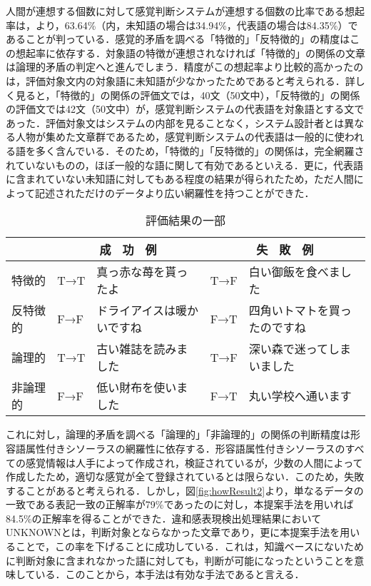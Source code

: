 \documentclass[japanese]{jnlp_1.4}
\begin{document}
人間が連想する個数に対して感覚判断システムが連想する個数の比率である想起率は，\cite{Watabe2004}より，63.64\%（内，未知語の場合は34.94\%，代表語の場合は84.35\%）であることが判っている．感覚的矛盾を調べる「特徴的」「反特徴的」の精度はこの想起率に依存する．対象語の特徴が連想されなければ「特徴的」の関係の文章は論理的矛盾の判定へと進んでしまう．精度がこの想起率より比較的高かったのは，評価対象文内の対象語に未知語が少なかったためであると考えられる．詳しく見ると，「特徴的」の関係の評価文では，40文（50文中），「反特徴的」の関係の評価文では42文（50文中）が，感覚判断システムの代表語を対象語とする文であった．評価対象文はシステムの内部を見ることなく，システム設計者とは異なる人物が集めた文章群であるため，感覚判断システムの代表語は一般的に使われる語を多く含んでいる．そのため，「特徴的」「反特徴的」の関係は，完全網羅されていないものの，ほぼ一般的な語に関して有効であるといえる．更に，代表語に含まれていない未知語に対してもある程度の結果が得られたため，ただ人間によって記述されただけのデータより広い網羅性を持つことができた．

\begin{table}[t]
	\caption{評価結果の一部}
	\label{tb:JudgeResult}
	\begin{center}
	\begin{tabular}{|l|l|l|l|l|}
		\hline
		& \multicolumn{2}{c|}{成　功　例} & \multicolumn{2}{c|}{失　敗　例} \\
		\hline
			特徴的 & T→T & 真っ赤な苺を貰ったよ & T→F & 白い御飯を食べました \\
		\hline
			反特徴的 & F→F & ドライアイスは暖かいですね & F→T & 四角いトマトを買ったのですね \\
		\hline
			論理的 & T→T & 古い雑誌を読みました & T→F & 深い森で迷ってしまいました \\
		\hline
			非論理的 & F→F & 低い財布を使いました & F→T & 丸い学校へ通います \\
		\hline
	\end{tabular}
	\end{center}
\end{table}

これに対し，論理的矛盾を調べる「論理的」「非論理的」の関係の判断精度は形容語属性付きシソーラスの網羅性に依存する．形容語属性付きシソーラスのすべての感覚情報は人手によって作成され，検証されているが，少数の人間によって作成したため，適切な感覚が全て登録されているとは限らない．このため，失敗することがあると考えられる．しかし，図\ref{fig:howResult2}より，単なるデータの一致である表記一致の正解率が79\%であったのに対し，本提案手法を用いれば84.5\%の正解率を得ることができた．違和感表現検出処理結果においてUNKNOWNとは，判断対象とならなかった文章であり，更に本提案手法を用いることで，この率を下げることに成功している．これは，知識ベースにないために判断対象に含まれなかった語に対しても，判断が可能になったということを意味している．このことから，本手法は有効な手法であると言える．
\end{document}
